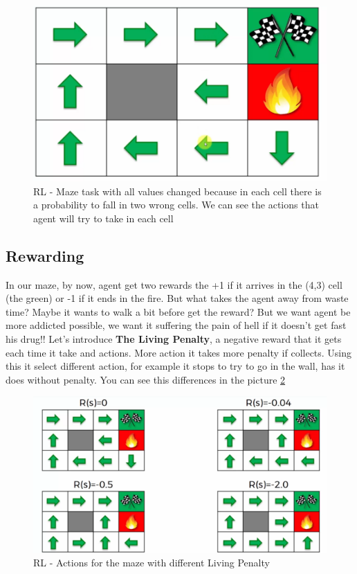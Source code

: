 \begin{figure}
    \centering
    \includegraphics[scale=0.35]{img/rl-maze-plan.png}
    \caption{RL - Maze task with all values changed because in each cell there is a probability to fall in two wrong cells. We can see the actions that agent will try to take in each cell}
    \label{img:RL-Maze-plan}
\end{figure}

\subsection{Rewarding}

In our maze, by now, agent get two rewards the +1 if it arrives in the (4,3) cell (the green) or -1 if it ends in the fire. But what takes the agent away from waste time? Maybe it wants to walk a bit before get the reward? But we want agent be more addicted possible, we want it suffering the pain of hell if it doesn't get fast his drug!! Let's introduce \textbf{The Living Penalty}, a negative reward that it gets each time it take and actions. More action it takes more penalty if collects. Using this it select different action, for example it stops to try to go in the wall, has it does without penalty. You can see this differences in the picture \ref{img:RL-Maze-LP} 

\begin{figure}
    \centering
    \includegraphics[scale=0.35]{img/rl-maze-LP.png}
    \caption{RL - Actions for the maze with different Living Penalty}
    \label{img:RL-Maze-LP}
\end{figure}

